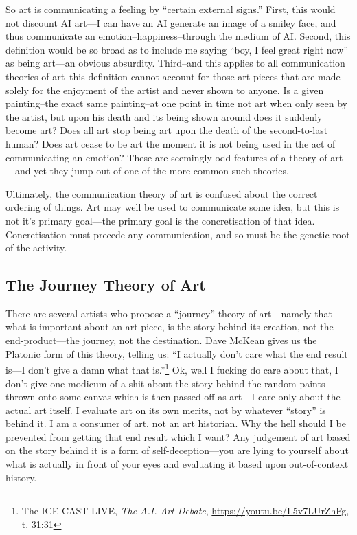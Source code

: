\documentclass[11pt]{article}
\begin{document}
So art is communicating a feeling by ``certain external signs.'' First, this would not discount AI art---I can have an AI generate an image of a smiley face, and thus communicate an emotion--happiness--through the medium of AI. Second, this definition would be so broad as to include me saying ``boy, I feel great right now'' as being art---an obvious absurdity. Third--and this applies to all communication theories of art--this definition cannot account for those art pieces that are made solely for the enjoyment of the artist and never shown to anyone. Is a given painting--the exact same painting--at one point in time not art when only seen by the artist, but upon his death and its being shown around does it suddenly become art? Does all art stop being art upon the death of the second-to-last human? Does art cease to be art the moment it is not being used in the act of communicating an emotion? These are seemingly odd features of a theory of art---and yet they jump out of one of the more common such theories.

Ultimately, the communication theory of art is confused about the correct ordering of things. Art may well be used to communicate some idea, but this is not it's primary goal---the primary goal is the concretisation of that idea. Concretisation must precede any communication, and so must be the genetic root of the activity.

\subsection*{The Journey Theory of Art}
\label{sec:orgbc93d34}
There are several artists who propose a ``journey'' theory of art---namely that what is important about an art piece, is the story behind its creation, not the end-product---the journey, not the destination. Dave McKean gives us the Platonic form of this theory, telling us: ``I actually don't care what the end result is---I don't give a damn what that is.''\footnote{The ICE-CAST LIVE, \emph{The A.I. Art Debate}, \url{https://youtu.be/L5v7LUrZhFg}, t. 31:31} Ok, well I fucking do care about that, I don't give one modicum of a shit about the story behind the random paints thrown onto some canvas which is then passed off as art---I care only about the actual art itself. I evaluate art on its own merits, not by whatever ``story'' is behind it. I am a consumer of art, not an art historian. Why the hell should I be prevented from getting that end result which I want? Any judgement of art based on the story behind it is a form of self-deception---you are lying to yourself about what is actually in front of your eyes and evaluating it based upon out-of-context history.
\end{document}
